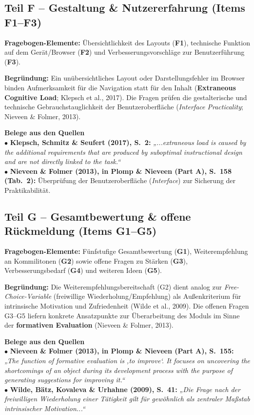 \documentclass[a4paper,10pt]{article}
\newcommand{\quotebox}[2]{%
  \begin{tcolorbox}[
    colback=lightgray,
    colframe=accent,
    arc=1.5mm,
    boxrule=0pt,
    leftrule=3pt,
    top=5pt, bottom=5pt, left=8pt, right=8pt
  ]
  {\small \textbf{\color{primary} #1}\\[2pt]
  #2}
  \end{tcolorbox}
}
\begin{document}
\subsection*{\color{primary} Teil F – Gestaltung \& Nutzererfahrung (Items F1–F3)}
\textbf{Fragebogen-Elemente:} Übersichtlichkeit des Layouts (\textbf{F1}), technische Funktion auf dem Gerät/Browser (\textbf{F2}) und Verbesserungsvorschläge zur Benutzerführung (\textbf{F3}).

\textbf{Begründung:} Ein unübersichtliches Layout oder Darstellungsfehler im Browser binden Aufmerksamkeit für die Navigation statt für den Inhalt (\textbf{Extraneous Cognitive Load}; Klepsch et al., 2017). Die Fragen prüfen die gestalterische und technische Gebrauchstauglichkeit der Benutzeroberfläche (\textit{Interface Practicality}; Nieveen \& Folmer, 2013).

\quotebox{Belege aus den Quellen}{
$\bullet$ \textbf{Klepsch, Schmitz \& Seufert (2017), S.~2:} \textit{„...extraneous load is caused by the additional requirements that are produced by suboptimal instructional design and are not directly linked to the task.“}\\[3pt]
$\bullet$ \textbf{Nieveen \& Folmer (2013), in Plomp \& Nieveen (Part A), S.~158 (Tab.~2):} Überprüfung der Benutzeroberfläche (\textit{Interface}) zur Sicherung der Praktikabilität.
}

\subsection*{\color{primary} Teil G – Gesamtbewertung \& offene Rückmeldung (Items G1–G5)}
\textbf{Fragebogen-Elemente:} Fünfstufige Gesamtbewertung (\textbf{G1}), Weiterempfehlung an Kommilitonen (\textbf{G2}) sowie offene Fragen zu Stärken (\textbf{G3}), Verbesserungsbedarf (\textbf{G4}) und weiteren Ideen (\textbf{G5}).

\textbf{Begründung:} Die Weiterempfehlungsbereitschaft (G2) dient analog zur \textit{Free-Choice-Variable} (freiwillige Wiederholung/Empfehlung) als Außenkriterium für intrinsische Motivation und Zufriedenheit (Wilde et al., 2009). Die offenen Fragen G3–G5 liefern konkrete Ansatzpunkte zur Überarbeitung des Moduls im Sinne der \textbf{formativen Evaluation} (Nieveen \& Folmer, 2013).

\quotebox{Belege aus den Quellen}{
$\bullet$ \textbf{Nieveen \& Folmer (2013), in Plomp \& Nieveen (Part A), S.~155:} \textit{„The function of formative evaluation is ‚to improve‘. It focuses on uncovering the shortcomings of an object during its development process with the purpose of generating suggestions for improving it.“}\\[3pt]
$\bullet$ \textbf{Wilde, Bätz, Kovaleva \& Urhahne (2009), S.~41:} \textit{„Die Frage nach der freiwilligen Wiederholung einer Tätigkeit gilt für gewöhnlich als zentraler Maßstab intrinsischer Motivation...“}
}
\end{document}
